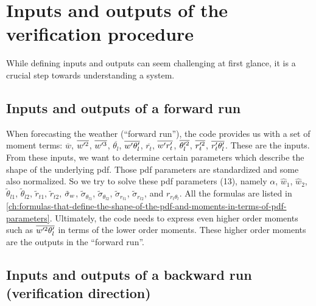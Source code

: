 \section{Inputs and outputs of the verification procedure}
\label{sec:inputs-and-outputs-of-the-verification-procedure}

While defining inputs and outputs can seem challenging at first glance,
it is a crucial step towards understanding a system.

\subsection{Inputs and outputs of a forward run}
\label{subsec:inputs-and-outputs-of-a-forward-run}

When forecasting the weather (\enquote{forward run}),
the code provides us with a set of moment terms:
$\overline{w}$, $\overline{w'^2}$, $\overline{w'^3}$, $\overline{\theta_l}$, $\overline{w' \theta_l'}$,
$\overline{r_t}$, $\overline{w' r_t'}$, $\overline{\theta_l'^2}$, $\overline{r_t'^2}$, $\overline{r_t' \theta_l'}$.
These are the inputs.
From these inputs,
we want to determine certain parameters which describe the shape of the underlying \gls{pdf}.
Those \gls{pdf} parameters are standardized and some also normalized.
So we try to solve these \gls{pdf} parameters (13),
namely $\alpha$, $\widehat{w}_1$, $\widehat{w}_2$, $\tilde{\theta}_{l1}$, $\tilde{\theta}_{l2}$, $\tilde{r}_{t1}$,
$\tilde{r}_{t2}$, ${\tilde{\sigma}_w}$, $\tilde{\sigma}_{\theta_{l1}}$, $\tilde{\sigma}_{\theta_{l2}}$,
$\tilde{\sigma}_{r_{t1}}$, $\tilde{\sigma}_{r_{t2}}$, and $r_{r_t \theta_l}$.
All the formulas are listed in \cref{ch:formulas-that-define-the-shape-of-the-pdf-and-moments-in-terms-of-pdf-parameters}.
Ultimately, the code needs to express even higher order moments such as $\overline{w'^2 \theta_l'}$
in terms of the lower order moments.
These higher order moments are the outputs in the \enquote{forward run}.

\subsection{Inputs and outputs of a backward run (verification direction)}
\label{subsec:inputs-and-outputs-of-a-backward-run-(verification-direction)}

